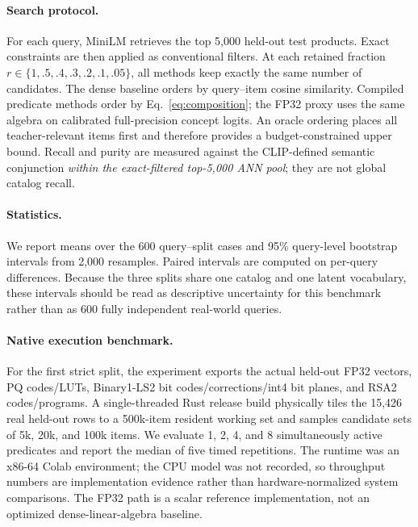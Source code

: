 \paragraph{Search protocol.} For each query, MiniLM retrieves the top 5,000 held-out test products. Exact constraints are then applied as conventional filters. At each retained fraction $r\in\{1,.5,.4,.3,.2,.1,.05\}$, all methods keep exactly the same number of candidates. The dense baseline orders by query--item cosine similarity. Compiled predicate methods order by Eq.~\eqref{eq:composition}; the FP32 proxy uses the same algebra on calibrated full-precision concept logits. An oracle ordering places all teacher-relevant items first and therefore provides a budget-constrained upper bound. Recall and purity are measured against the CLIP-defined semantic conjunction \emph{within the exact-filtered top-5,000 ANN pool}; they are not global catalog recall.

\paragraph{Statistics.} We report means over the 600 query--split cases and 95\% query-level bootstrap intervals from 2,000 resamples. Paired intervals are computed on per-query differences. Because the three splits share one catalog and one latent vocabulary, these intervals should be read as descriptive uncertainty for this benchmark rather than as 600 fully independent real-world queries.

\paragraph{Native execution benchmark.} For the first strict split, the experiment exports the actual held-out FP32 vectors, PQ codes/LUTs, Binary1-LS2 bit codes/corrections/int4 bit planes, and RSA2 codes/programs. A single-threaded Rust release build physically tiles the 15,426 real held-out rows to a 500k-item resident working set and samples candidate sets of 5k, 20k, and 100k items. We evaluate 1, 2, 4, and 8 simultaneously active predicates and report the median of five timed repetitions. The runtime was an x86-64 Colab environment; the CPU model was not recorded, so throughput numbers are implementation evidence rather than hardware-normalized system comparisons. The FP32 path is a scalar reference implementation, not an optimized dense-linear-algebra baseline.

